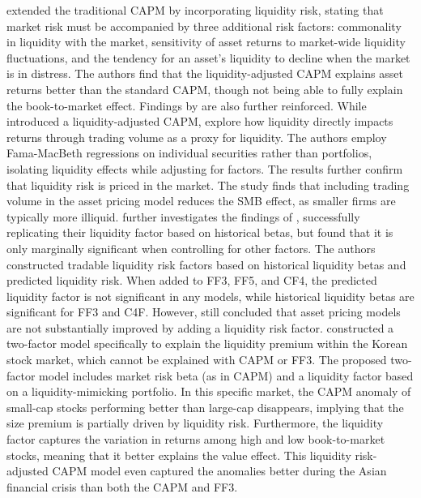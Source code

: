 extended the traditional CAPM by incorporating liquidity risk, stating that market risk must be accompanied by three additional risk factors: commonality in liquidity with the market, sensitivity of asset returns to market-wide liquidity fluctuations, and the tendency for an asset's liquidity to decline when the market is in distress. The authors find that the liquidity-adjusted CAPM explains asset returns better than the standard CAPM, though not being able to fully explain the book-to-market effect. Findings by  are also further reinforced. While  introduced a liquidity-adjusted CAPM,  explore how liquidity directly impacts returns through trading volume as a proxy for liquidity. The authors employ Fama-MacBeth regressions on individual securities rather than portfolios, isolating liquidity effects while adjusting for  factors. The results further confirm that liquidity risk is priced in the market. The study finds that including trading volume in the asset pricing model reduces the SMB effect, as smaller firms are typically more illiquid.  further investigates the findings of , successfully replicating their liquidity factor based on historical betas, but found that it is only marginally significant when controlling for other factors. The authors constructed tradable liquidity risk factors based on historical liquidity betas and predicted liquidity risk. When added to FF3, FF5, and CF4, the predicted liquidity factor is not significant in any models, while historical liquidity betas are significant for FF3 and C4F. However,  still concluded that asset pricing models are not substantially improved by adding a liquidity risk factor.  constructed a two-factor model specifically to explain the liquidity premium within the Korean stock market, which cannot be explained with CAPM or FF3. The proposed two-factor model includes market risk beta (as in CAPM) and a liquidity factor based on a liquidity-mimicking portfolio. In this specific market, the CAPM anomaly of small-cap stocks performing better than large-cap disappears, implying that the size premium is partially driven by liquidity risk. Furthermore, the liquidity factor captures the variation in returns among high and low book-to-market stocks, meaning that it better explains the value effect. This liquidity risk-adjusted CAPM model even captured the anomalies better during the Asian financial crisis than both the CAPM and FF3.

